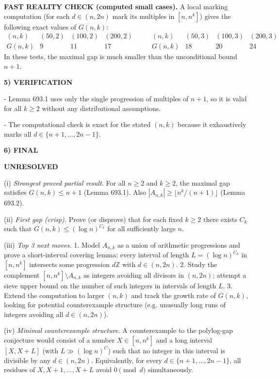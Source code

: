 \medskip
\noindent\textbf{FAST REALITY CHECK (computed small cases).}
A local marking computation (for each $d\in(n,2n)$ mark its multiples in $[n,n^k]$) gives the following exact values of $G(n,k)$:
\[
\begin{array}{c|ccc}
(n,k) & (50,2) & (100,2) & (200,2)\\\hline
G(n,k) & 9 & 11 & 17
\end{array}
\qquad
\begin{array}{c|ccc}
(n,k) & (50,3) & (100,3) & (200,3)\\\hline
G(n,k) & 18 & 20 & 24
\end{array}
\]
In these tests, the maximal gap is much smaller than the unconditional bound $n+1$.

\bigskip
\noindent\textbf{5) VERIFICATION}

- Lemma 693.1 uses only the single progression of multiples of $n+1$, so it is valid for all $k\ge 2$ without any distributional assumptions.

- The computational check is exact for the stated $(n,k)$ because it exhaustively marks all $d\in\{n+1,\dots,2n-1\}$.

\bigskip
\noindent\textbf{6) FINAL}

\textbf{UNRESOLVED}

(i) \emph{Strongest proved partial result.} For all $n\ge 2$ and $k\ge 2$, the maximal gap satisfies $G(n,k)\le n+1$ (Lemma 693.1). Also $|A_{n,k}|\ge \lfloor n^k/(n+1)\rfloor$ (Lemma 693.2).

(ii) \emph{First gap (crisp).} Prove (or disprove) that for each fixed $k\ge 2$ there exists $C_k$ such that $G(n,k)\le (\log n)^{C_k}$ for all sufficiently large $n$.

(iii) \emph{Top 3 next moves.}
1. Model $A_{n,k}$ as a union of arithmetic progressions and prove a short-interval covering lemma: every interval of length $L=(\log n)^{C_k}$ in $[n,n^k]$ intersects some progression $d\mathbb{Z}$ with $d\in(n,2n)$.
2. Study the complement $[n,n^k]\setminus A_{n,k}$ as integers avoiding all divisors in $(n,2n)$; attempt a sieve upper bound on the number of such integers in intervals of length $L$.
3. Extend the computation to larger $(n,k)$ and track the growth rate of $G(n,k)$, looking for potential counterexample structure (e.g. unusually long runs of integers avoiding all $d\in(n,2n)$).

(iv) \emph{Minimal counterexample structure.} A counterexample to the polylog-gap conjecture would consist of a number $X\in[n,n^k]$ and a long interval $[X,X+L]$ (with $L\gg (\log n)^C$) such that no integer in this interval is divisible by any $d\in(n,2n)$. Equivalently, for every $d\in\{n+1,\dots,2n-1\}$, all residues of $X,X+1,\dots,X+L$ avoid $0\pmod d$ simultaneously.



